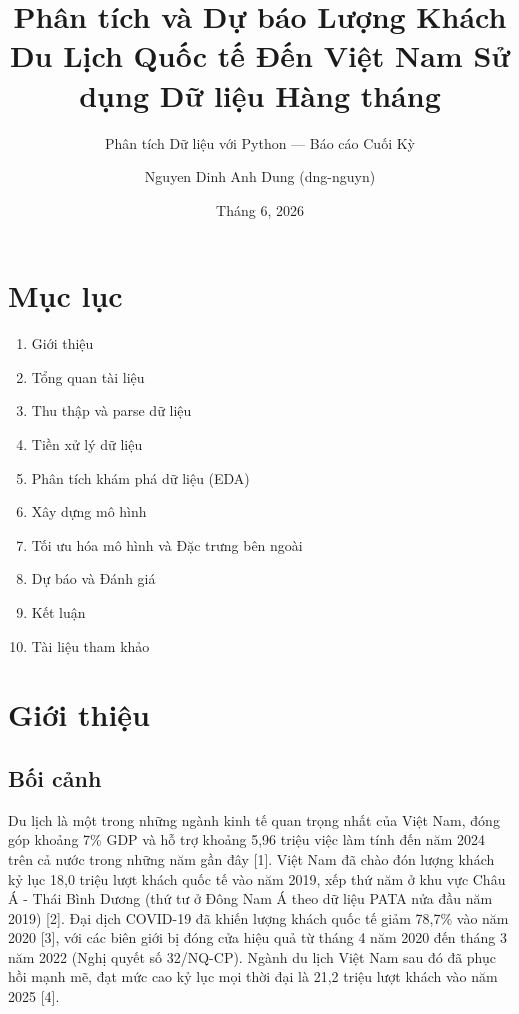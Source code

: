\documentclass[
]{article}
\title{Phân tích và Dự báo Lượng Khách Du Lịch Quốc tế Đến Việt Nam Sử
dụng Dữ liệu Hàng tháng}
\subtitle{Phân tích Dữ liệu với Python --- Báo cáo Cuối Kỳ}
\author{Nguyen Dinh Anh Dung (dng-nguyn)}
\date{Tháng 6, 2026}
\providecommand{\tightlist}{%
  \setlength{\itemsep}{0pt}\setlength{\parskip}{0pt}}
\begin{document}
\maketitle

\newpage

\section{Mục lục}\label{mux1ee5c-lux1ee5c}

\begin{enumerate}
\def\labelenumi{\arabic{enumi}.}
\setcounter{enumi}{1}
\tightlist
\item
  Giới thiệu
\item
  Tổng quan tài liệu
\item
  Thu thập và parse dữ liệu
\item
  Tiền xử lý dữ liệu
\item
  Phân tích khám phá dữ liệu (EDA)
\item
  Xây dựng mô hình
\item
  Tối ưu hóa mô hình và Đặc trưng bên ngoài
\item
  Dự báo và Đánh giá
\item
  Kết luận
\item
  Tài liệu tham khảo
\end{enumerate}

\newpage

\section{Giới thiệu}\label{giux1edbi-thiux1ec7u}

\subsection{Bối cảnh}\label{bux1ed1i-cux1ea3nh}

Du lịch là một trong những ngành kinh tế quan trọng nhất của Việt Nam,
đóng góp khoảng 7\% GDP và hỗ trợ khoảng 5,96 triệu việc làm tính đến
năm 2024 trên cả nước trong những năm gần đây {[}1{]}. Việt Nam đã chào
đón lượng khách kỷ lục 18,0 triệu lượt khách quốc tế vào năm 2019, xếp
thứ năm ở khu vực Châu Á - Thái Bình Dương (thứ tư ở Đông Nam Á theo dữ
liệu PATA nửa đầu năm 2019) {[}2{]}. Đại dịch COVID-19 đã khiến lượng
khách quốc tế giảm 78,7\% vào năm 2020 {[}3{]}, với các biên giới bị
đóng cửa hiệu quả từ tháng 4 năm 2020 đến tháng 3 năm 2022 (Nghị quyết
số 32/NQ-CP). Ngành du lịch Việt Nam sau đó đã phục hồi mạnh mẽ, đạt mức
cao kỷ lục mọi thời đại là 21,2 triệu lượt khách vào năm 2025 {[}4{]}.
\end{document}
